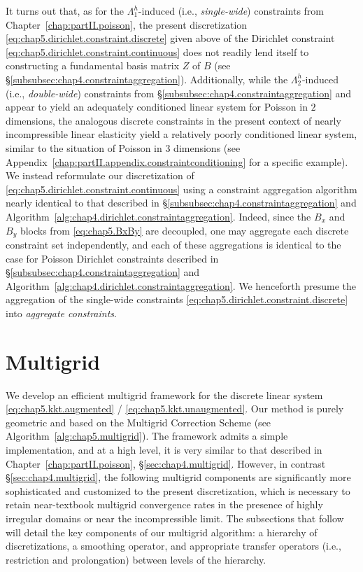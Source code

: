 It turns out that, as for the $\Lambda^h_1$-induced (i.e., \emph{single-wide}) constraints from Chapter~\ref{chap:partII.poisson}, the present discretization \eqref{eq:chap5.dirichlet.constraint.discrete} given above of the Dirichlet constraint \eqref{eq:chap5.dirichlet.constraint.continuous} does not readily lend itself to constructing a fundamental basis matrix $Z$ of $B$ (see \S\ref{subsubsec:chap4.constraintaggregation}). Additionally, while the $\Lambda^h_2$-induced (i.e., \emph{double-wide}) constraints from \S\ref{subsubsec:chap4.constraintaggregation} and \cite{Bedrossian10} appear to yield an adequately conditioned linear system for Poisson in $2$ dimensions, the analogous discrete constraints in the present context of nearly incompressible linear elasticity yield a relatively poorly conditioned linear system, similar to the situation of Poisson in $3$ dimensions (see Appendix~\ref{chap:partII.appendix.constraintconditioning} for a specific example). We instead reformulate our discretization of \eqref{eq:chap5.dirichlet.constraint.continuous} using a constraint aggregation algorithm nearly identical to that described in \S\ref{subsubsec:chap4.constraintaggregation} and Algorithm~\ref{alg:chap4.dirichlet.constraintaggregation}. Indeed, since the $B_x$ and $B_y$ blocks from \eqref{eq:chap5.BxBy} are decoupled, one may aggregate each discrete constraint set independently, and each of these aggregations is identical to the case for Poisson Dirichlet constraints described in \S\ref{subsubsec:chap4.constraintaggregation} and Algorithm~\ref{alg:chap4.dirichlet.constraintaggregation}. We henceforth presume the aggregation of the single-wide constraints \eqref{eq:chap5.dirichlet.constraint.discrete} into \emph{aggregate constraints}.

\section{Multigrid} \label{sec:chap5.multigrid}

We develop an efficient multigrid framework for the discrete linear system \eqref{eq:chap5.kkt.augmented} / \eqref{eq:chap5.kkt.unaugmented}. Our method is purely geometric and based on the Multigrid Correction Scheme (see Algorithm~\ref{alg:chap5.multigrid}). The framework admits a simple implementation, and at a high level, it is very similar to that described in Chapter~\ref{chap:partII.poisson}, \S\ref{sec:chap4.multigrid}. However, in contrast \S\ref{sec:chap4.multigrid}, the following multigrid components are significantly more sophisticated and customized to the present discretization, which is necessary to retain near-textbook multigrid convergence rates in the presence of highly irregular domains or near the incompressible limit. The subsections that follow will detail the key components of our multigrid algorithm: a hierarchy of discretizations, a smoothing operator, and appropriate transfer operators (i.e., restriction and prolongation) between levels of the hierarchy.


